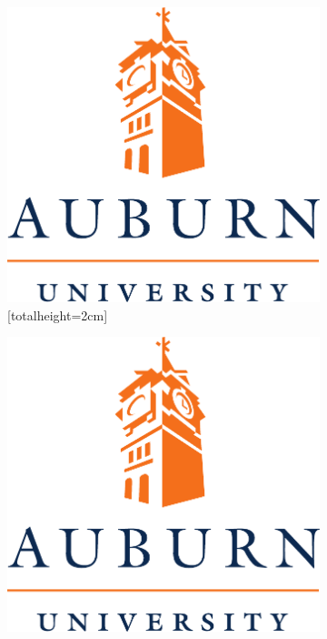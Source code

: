 \documentclass[article]{beamer}
\begin{document}
\begin{frame}
\begin{figure}[]
\begin{subfigure}[b]{0.3\linewidth}
      \centering
      \includegraphics[totalheight=2cm]{aulogo.pdf}
      \caption{[totalheight=2cm]}
    \end{subfigure}
    \hfill
    \begin{subfigure}[b]{0.3\linewidth}
      \centering
      \includegraphics[scale=0.2]{aulogo.pdf}

\end{subfigure}
\end{figure}
\end{frame}
\end{document}
